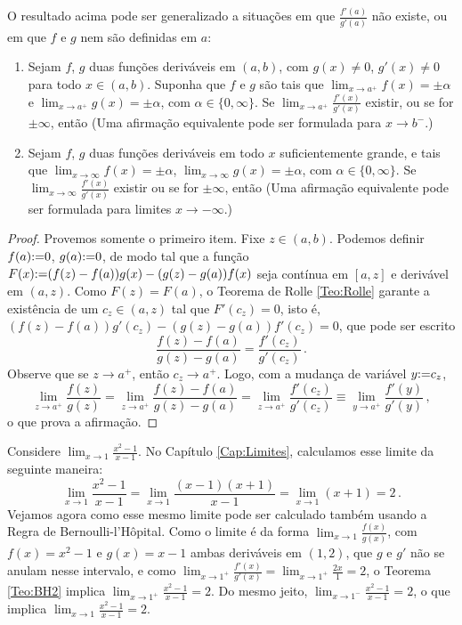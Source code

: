 O resultado acima pode ser generalizado a situações em que
$\frac{f'(a)}{g'(a)}$ não existe, ou em que $f$ e $g$ nem são definidas em $a$:

\begin{teo}\label{Teo:BH2}\mbox{}
\begin{enumerate}
 \item {}
Sejam $f$, $g$ duas funções deriváveis em $(a,b)$, 
com $g(x)\neq 0$, $g'(x)\neq 0$ para todo $x\in (a,b)$. Suponha que $f$ e
$g$ são 
tais
que $\lim_{x\to a^+}f(x)=\pm \alpha$ e $\lim_{x\to a^+}g(x)=\pm \alpha$, com
$\alpha\in \{0,\infty\}$. Se $\lim_{x\to
a^+}\frac{f'(x)}{g'(x)}$ existir, ou se for $\pm \infty$, então
(Uma afirmação equivalente pode ser formulada para $x\to b^-$.)
\item {}
Sejam $f$, $g$ duas funções deriváveis em todo $x$ suficientemente grande, e
tais
que $\lim_{x\to \infty}f(x)=\pm \alpha$, $\lim_{x\to \infty}g(x)=\pm \alpha$,
com $\alpha\in \{0,\infty\}$. Se
$\lim_{x\to
\infty}\frac{f'(x)}{g'(x)}$ existir ou se for $\pm \infty$, então
(Uma afirmação equivalente pode ser formulada para limites $x\to -\infty$.)
\end{enumerate}
\end{teo}
\begin{proof} Provemos somente o primeiro item. Fixe $z\in (a,b)$.
Podemos definir $f(a){:=} 0$, $g(a){:=} 0$, de modo tal que a função
$F(x){:=}
(f(z)-f(a))g(x)-(g(z)-g(a))f(x)$ seja contínua em $[a,z]$ e derivável em
$(a,z)$.
Como $F(z)=F(a)$, o Teorema de Rolle \ref{Teo:Rolle} garante a existência de um
$c_z\in (a,z)$ tal que $F'(c_z)=0$, isto é,
$(f(z)-f(a))g'(c_z)-(g(z)-g(a))f'(c_z)=0$, que pode ser escrito
$$
\frac{f(z)-f(a)}{g(z)-g(a)}=\frac{f'(c_z)}{g'(c_z)}\,.
$$
Observe que se $z\to a^+$, então $c_z\to a^+$. Logo, com a mudança de variável
$y{:=} c_z$,
$$
\lim_{z\to a^+}\frac{f(z)}{g(z)}
=\lim_{z\to a^+}\frac{f(z)-f(a)}{g(z)-g(a)}=
\lim_{z\to a^+}\frac{f'(c_z)}{g'(c_z)}\equiv 
\lim_{y\to a^+}\frac{f'(y)}{g'(y)}\,,
$$
o que prova a afirmação.
\end{proof}

\begin{ex}
Considere $\lim_{x\to 1}\frac{x^2-1}{x-1}$. No Capítulo
\ref{Cap:Limites},
calculamos esse limite da seguinte maneira: 
$$\lim_{x\to
1}\frac{x^2-1}{x-1}=\lim_{x\to 1}\frac{(x-1)(x+1)}{x-1}=\lim_{x\to
1}(x+1)=2\,.$$ 
Vejamos agora como esse mesmo limite pode ser calculado também usando a Regra de
Bernoulli-l'Hôpital. Como o limite é da forma 
$\lim_{x\to 1}\frac{f(x)}{g(x)}$, com $f(x)=x^2-1$ e $g(x)=x-1$ ambas deriváveis
em $(1,2)$, que $g$ e $g'$ não se anulam nesse intervalo, e como $\lim_{x\to
1^+}\frac{f'(x)}{g'(x)}=
\lim_{x\to 1^+}\frac{2x}{1}=2$, o Teorema \ref{Teo:BH2} implica
$\lim_{x\to
1^+}\frac{x^2-1}{x-1}=2$. Do mesmo jeito, $\lim_{x\to
1^-}\frac{x^2-1}{x-1}=2$, o que implica $\lim_{x\to
1}\frac{x^2-1}{x-1}=2$.
\end{ex}

